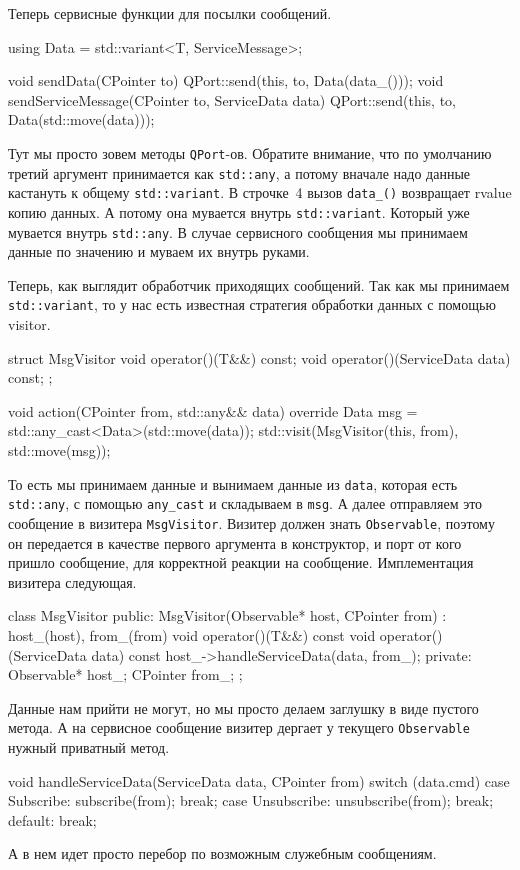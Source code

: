 Теперь сервисные функции для посылки сообщений.
\begin{cppcode}
using Data = std::variant<T, ServiceMessage>;

void sendData(CPointer to) {
  QPort::send(this, to, Data(data_()));
}
void sendServiceMessage(CPointer to, ServiceData data)  {
  QPort::send(this, to, Data(std::move(data)));
}
\end{cppcode}
Тут мы просто зовем методы \verb"QPort"-ов.
Обратите внимание, что по умолчанию третий аргумент принимается как \verb"std::any", а потому вначале надо данные кастануть к общему \verb"std::variant".
В строчке~4 вызов \verb"data_()" возвращает rvalue копию данных.
А потому она мувается внутрь \verb"std::variant".
Который уже мувается внутрь \verb"std::any".
В случае сервисного сообщения мы принимаем данные по значению и муваем их внутрь руками.

Теперь, как выглядит обработчик приходящих сообщений.
Так как мы принимаем \verb"std::variant", то у нас есть известная стратегия обработки данных с помощью visitor.
\begin{cppcode}
struct MsgVisitor {
  void operator()(T&&) const;
  void operator()(ServiceData data) const;
};

void action(CPointer from, std::any&& data) override {
  Data msg = std::any_cast<Data>(std::move(data));
  std::visit(MsgVisitor(this, from), std::move(msg));
}
\end{cppcode}
То есть мы принимаем данные и вынимаем данные из \verb"data", которая есть \verb"std::any", с помощью \verb"any_cast" и складываем в \verb"msg".
А далее отправляем это сообщение в визитера \verb"MsgVisitor".
Визитер должен знать \verb"Observable", поэтому он передается в качестве первого аргумента в конструктор, и порт от кого пришло сообщение, для корректной реакции на сообщение.
Имплементация визитера следующая.
\begin{cppcode}
class MsgVisitor {
public:
  MsgVisitor(Observable* host, CPointer from) : host_(host), from_(from) {
  }
  void operator()(T&&) const {
  }
  void operator()(ServiceData data) const {
    host_->handleServiceData(data, from_);
  }
private:
  Observable* host_;
  CPointer from_;
};
\end{cppcode}
Данные нам прийти не могут, но мы просто делаем заглушку в виде пустого метода.
А на сервисное сообщение визитер дергает у текущего \verb"Observable" нужный приватный метод.
\begin{cppcode}
void handleServiceData(ServiceData data, CPointer from) {
  switch (data.cmd) {
  case Subscribe:
    subscribe(from);
    break;
  case Unsubscribe:
    unsubscribe(from);
    break;
  default:
    break;
  }
}
\end{cppcode}
А в нем идет просто перебор по возможным служебным сообщениям.

